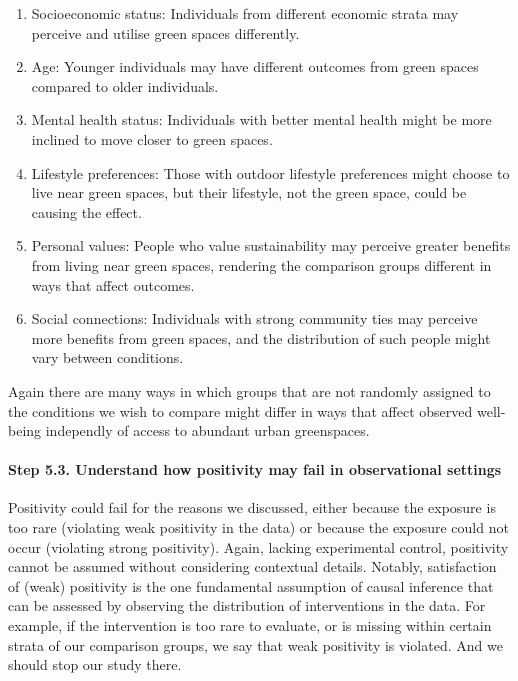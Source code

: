 \documentclass[
  singlecolumn]{article}
\let\oldparagraph\paragraph
\renewcommand{\paragraph}[1]{\oldparagraph{#1}\mbox{}}
\begin{document}
\begin{enumerate}
\def\labelenumi{\alph{enumi}.}
\item
  Socioeconomic status: Individuals from different economic strata may
  perceive and utilise green spaces differently.
\item
  Age: Younger individuals may have different outcomes from green spaces
  compared to older individuals.
\item
  Mental health status: Individuals with better mental health might be
  more inclined to move closer to green spaces.
\item
  Lifestyle preferences: Those with outdoor lifestyle preferences might
  choose to live near green spaces, but their lifestyle, not the green
  space, could be causing the effect.
\item
  Personal values: People who value sustainability may perceive greater
  benefits from living near green spaces, rendering the comparison
  groups different in ways that affect outcomes.
\item
  Social connections: Individuals with strong community ties may
  perceive more benefits from green spaces, and the distribution of such
  people might vary between conditions.
\end{enumerate}

Again there are many ways in which groups that are not randomly assigned
to the conditions we wish to compare might differ in ways that affect
observed well-being independly of access to abundant urban greenspaces.

\hypertarget{step-5.3.-understand-how-positivity-may-fail-in-observational-settings}{%
\paragraph{\texorpdfstring{\textbf{Step 5.3. Understand how positivity
may fail in observational
settings}}{Step 5.3. Understand how positivity may fail in observational settings}}\label{step-5.3.-understand-how-positivity-may-fail-in-observational-settings}}

Positivity could fail for the reasons we discussed, either because the
exposure is too rare (violating weak positivity in the data) or because
the exposure could not occur (violating strong positivity). Again,
lacking experimental control, positivity cannot be assumed without
considering contextual details. Notably, satisfaction of (weak)
positivity is the one fundamental assumption of causal inference that
can be assessed by observing the distribution of interventions in the
data. For example, if the intervention is too rare to evaluate, or is
missing within certain strata of our comparison groups, we say that weak
positivity is violated. And we should stop our study there.
\end{document}
